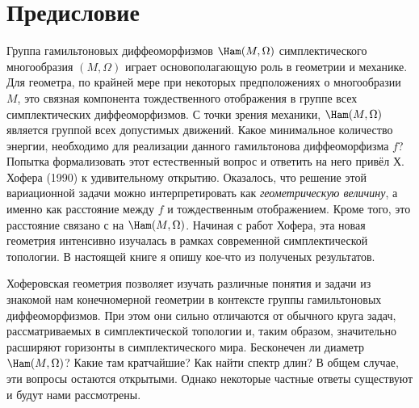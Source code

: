 \chapter*{Предисловие}

Группа гамильтоновых диффеоморфизмов $\Ham(M,\Omega)$ симплектического
многообразия $(M,\Omega)$ играет
основополагающую роль в геометрии и
механике.  Для геометра, по крайней мере при некоторых предположениях
о многообразии $M$, это связная компонента тождественного отображения
в группе всех симплектических диффеоморфизмов.  С точки зрения
механики, $\Ham(M,\Omega)$ является группой всех допустимых движений.
Какое минимальное количество энергии, необходимо для реализации
данного гамильтонова диффеоморфизма $f$?  Попытка формализовать этот
естественный вопрос и ответить на него привёл Х. Хофера \cite{H1}
(1990) к удивительному открытию.  Оказалось, что решение этой
вариационной задачи можно интерпретировать как \emph{геометрическую
  величину}, а именно как расстояние между $f$ и тождественным
отображением.  Кроме того, это расстояние связано с  на $\Ham(M,\Omega)$.  Начиная с работ
Хофера, эта новая геометрия интенсивно изучалась в рамках современной
симплектической топологии.  В настоящей книге я опишу кое-что из
полученых результатов.

Хоферовская геометрия позволяет изучать различные понятия и задачи из знакомой нам конечномерной геометрии в контексте группы гамильтоновых диффеоморфизмов.
При этом они сильно отличаются от обычного круга задач, рассматриваемых в симплектической топологии и, таким образом, значительно расширяют горизонты в симплектического мира.
Бесконечен ли диаметр $\Ham(M,\Omega)$?
Какие там кратчайшие?
Как найти спектр длин?
В общем случае, эти вопросы остаются открытыми.
Однако некоторые частные ответы существуют и будут нами рассмотрены.

